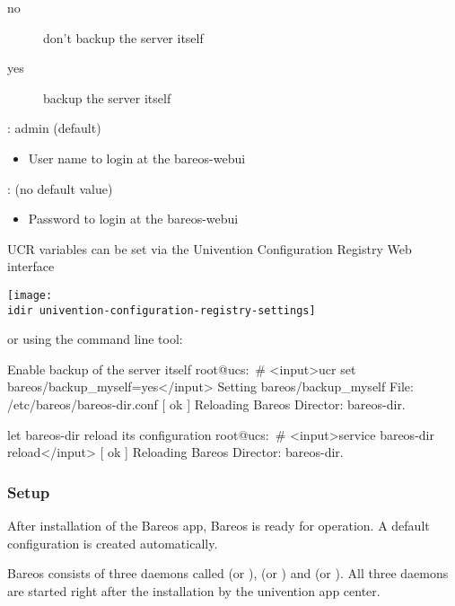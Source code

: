 \begin{description}
\begin{description}
	\item[no] don't backup the server itself
	\item[yes] backup the server itself
      \end{description}
        \item[\parameter{bareos/webui/console/user1/username}]: admin (default)
      \begin{itemize}
        \item User name to login at the bareos-webui
      \end{itemize}
        \item[\parameter{bareos/webui/console/user1/password}]: (no default value)
      \begin{itemize}
        \item Password to login at the bareos-webui
      \end{itemize}
    \end{description}

UCR variables can be set via the Univention Configuration Registry Web interface 

\begin{center}
  \texttt{[image: \\idir univention-configuration-registry-settings]}
\end{center}

or using the  command line tool:
\begin{commands}{Enable backup of the server itself}
root@ucs:~# <input>ucr set bareos/backup_myself=yes</input>
Setting bareos/backup_myself
File: /etc/bareos/bareos-dir.conf
[ ok ] Reloading Bareos Director: bareos-dir.
\end{commands}

\begin{commands}{let bareos-dir reload its configuration}
root@ucs:~# <input>service  bareos-dir reload</input>
[ ok ] Reloading Bareos Director: bareos-dir.
\end{commands}

    
    
\subsubsection{Setup}

After installation of the Bareos app, Bareos is ready for operation. A default configuration is created automatically.

Bareos consists of three daemons called  (or ),  (or ) and  (or ). All three daemons are started right after the installation by the univention app center.

